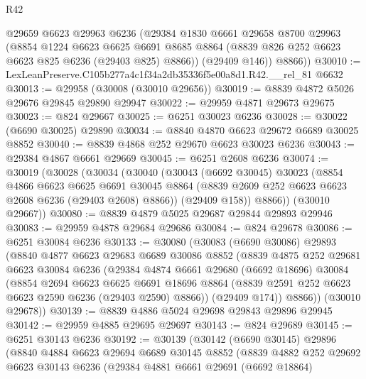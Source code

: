 \begin{lexlean}{R42}
\begin{coremodule}
{        @29659
        @6623
        @29963
        @6236
        (@29384
          @1830
          @6661
          @29658
          @8700
          @29963
          (@8854
            @1224
            @6623
            @6625
            @6691
            @8685
            @8864
            (@8839 @826 @252 @6623 @6623 @825 @6236 (@29403 @825) @8866))
          (@29409 @146))
        @8866))
@30010 := LexLeanPreserve.C105b277a4c1f34a2db35336f5e00a8d1.R42.__rel_81 @6632
@30013 := @29958 (@30008 (@30010 @29656))
@30019 := @8839 @4872 @5026 @29676 @29845 @29890 @29947
@30022 := @29959 @4871 @29673 @29675
@30023 := @824 @29667
@30025 := @6251 @30023 @6236
@30028 := @30022 (@6690 @30025) @29890
@30034 := @8840 @4870 @6623 @29672 @6689 @30025 @8852
@30040 := @8839 @4868 @252 @29670 @6623 @30023 @6236
@30043 := @29384 @4867 @6661 @29669
@30045 := @6251 @2608 @6236
@30074 := @30019
    (@30028
      (@30034
        (@30040
          (@30043
            (@6692 @30045)
            @30023
            (@8854
              @4866
              @6623
              @6625
              @6691
              @30045
              @8864
              (@8839 @2609 @252 @6623 @6623 @2608 @6236 (@29403 @2608) @8866))
            (@29409 @158))
          @8866))
      (@30010 @29667))
@30080 := @8839 @4879 @5025 @29687 @29844 @29893 @29946
@30083 := @29959 @4878 @29684 @29686
@30084 := @824 @29678
@30086 := @6251 @30084 @6236
@30133 := @30080
    (@30083
      (@6690 @30086)
      @29893
      (@8840
        @4877
        @6623
        @29683
        @6689
        @30086
        @8852
        (@8839
          @4875
          @252
          @29681
          @6623
          @30084
          @6236
          (@29384
            @4874
            @6661
            @29680
            (@6692 @18696)
            @30084
            (@8854
              @2694
              @6623
              @6625
              @6691
              @18696
              @8864
              (@8839 @2591 @252 @6623 @6623 @2590 @6236 (@29403 @2590) @8866))
            (@29409 @174))
          @8866))
      (@30010 @29678))
@30139 := @8839 @4886 @5024 @29698 @29843 @29896 @29945
@30142 := @29959 @4885 @29695 @29697
@30143 := @824 @29689
@30145 := @6251 @30143 @6236
@30192 := @30139
    (@30142
      (@6690 @30145)
      @29896
      (@8840
        @4884
        @6623
        @29694
        @6689
        @30145
        @8852
        (@8839
          @4882
          @252
          @29692
          @6623
          @30143
          @6236
          (@29384
            @4881
            @6661
            @29691
            (@6692 @18864)
}
\end{coremodule}
\end{lexlean}
